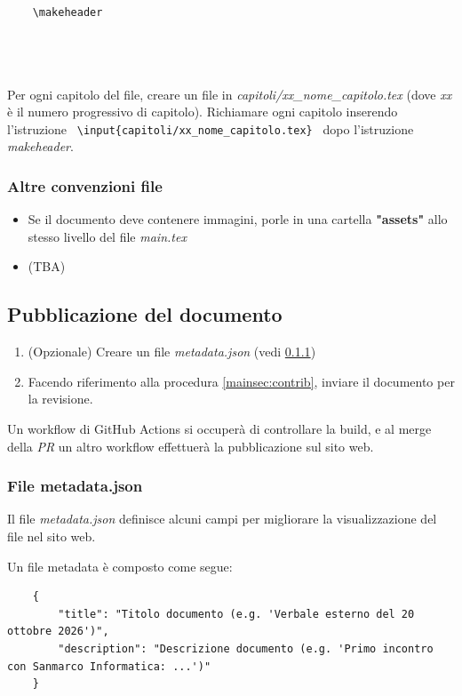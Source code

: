 \begin{verbatim}
    

    \makeheader


    
\end{verbatim}

Per ogni capitolo del file, creare un file in \textit{capitoli/xx\_nome\_capitolo.tex} (dove \textit{xx} è il numero progressivo di capitolo).
Richiamare ogni capitolo inserendo l'istruzione \texttt{ \textbackslash input\{capitoli/xx\_nome\_capitolo.tex\} } dopo l'istruzione \textit{makeheader}.

\subsubsection{Altre convenzioni file}
\begin{itemize}
    \item Se il documento deve contenere immagini, porle in una cartella \textbf{"assets"} allo stesso livello del file \textit{main.tex}
    \item (TBA)
\end{itemize}

\subsection{Pubblicazione del documento}
\begin{enumerate}
    \item (Opzionale) Creare un file \textit{metadata.json} (vedi \ref{docpub:metadata_json})
    \item Facendo riferimento alla procedura \ref{mainsec:contrib}, inviare il documento per la revisione.
\end{enumerate}
Un workflow di GitHub Actions si occuperà di controllare la build, e al merge della \textit{PR} un altro workflow effettuerà la pubblicazione sul sito web.


\subsubsection{File metadata.json}\label{docpub:metadata_json}
Il file \textit{metadata.json} definisce alcuni campi per migliorare la visualizzazione del file nel sito web.

Un file metadata è composto come segue:
\begin{verbatim}
    {
        "title": "Titolo documento (e.g. 'Verbale esterno del 20 ottobre 2026')",
        "description": "Descrizione documento (e.g. 'Primo incontro con Sanmarco Informatica: ...')"
    }
\end{verbatim}

